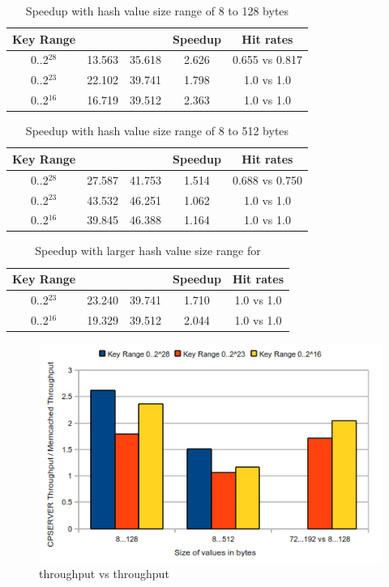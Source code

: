 \begin{table}[!ht]
\centering
\caption{Speedup with hash value size range of 8 to 128 bytes} 
\label{table:memcachedspeedup0}
\begin{tabular}{ | c | c | c | c | c | }
  \hline
  Key Range & \cpserver{} & \memcached{} & Speedup & Hit rates \\
  \hline
  0..2$^{28}$ & 13.563 & 35.618 & 2.626 & 0.655 vs 0.817 \\
  0..2$^{23}$ & 22.102 & 39.741 & 1.798 & 1.0 vs 1.0     \\
  0..2$^{16}$ & 16.719 & 39.512 & 2.363 & 1.0 vs 1.0     \\
  \hline
\end{tabular}
\end{table}

\begin{table}[!ht]
\centering
\caption{Speedup with hash value size range of 8 to 512 bytes} 
\label{table:memcachedspeedup1}
\begin{tabular}{ | c | c | c | c | c | }
  \hline
  Key Range & \cpserver{} & \memcached{} & Speedup & Hit rates \\
  \hline
  0..2$^{28}$ & 27.587 & 41.753 & 1.514 & 0.688 vs 0.750 \\
  0..2$^{23}$ & 43.532 & 46.251 & 1.062 & 1.0 vs 1.0     \\
  0..2$^{16}$ & 39.845 & 46.388 & 1.164 & 1.0 vs 1.0     \\
  \hline
\end{tabular}
\end{table}

\begin{table}[!ht]
\centering
\caption{Speedup with larger hash value size range for \cpserver{}} 
\label{table:memcachedspeedup2}
\begin{tabular}{ | c | c | c | c | c | }
  \hline
  Key Range & \cpserver{} & \memcached{} & Speedup & Hit rates \\
  \hline
  0..2$^{23}$ & 23.240 & 39.741 & 1.710 & 1.0 vs 1.0   \\
  0..2$^{16}$ & 19.329 & 39.512 & 2.044 & 1.0 vs 1.0   \\
  \hline
\end{tabular}
\end{table}

\begin{figure}[!ht]
  \centering
  \includegraphics[width=0.8\linewidth]{figs/cpserverspeedup2.png}
  \caption{\cpserver{} throughput vs \memcached{} throughput}
  \label{fig:cpserverspeedup2}
\end{figure}

